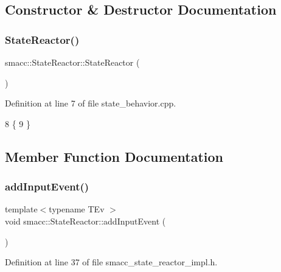 \subsection{Constructor \& Destructor Documentation}
\mbox{\label{classsmacc_1_1StateReactor_ae319e9f7b0a2a80b4c5ace6ec8c99fb2}} 
\subsubsection{\texorpdfstring{State\+Reactor()}{StateReactor()}}
{\footnotesize\ttfamily smacc\+::\+State\+Reactor\+::\+State\+Reactor (\begin{DoxyParamCaption}{ }\end{DoxyParamCaption})}



Definition at line 7 of file state\+\_\+behavior.\+cpp.


\begin{DoxyCode}
8 \{
9 \}
\end{DoxyCode}


\subsection{Member Function Documentation}
\mbox{\label{classsmacc_1_1StateReactor_acd4b35b4c82241fc27bb858761f6e4de}} 
\subsubsection{\texorpdfstring{add\+Input\+Event()}{addInputEvent()}}
{\footnotesize\ttfamily template$<$typename T\+Ev $>$ \\
void smacc\+::\+State\+Reactor\+::add\+Input\+Event (\begin{DoxyParamCaption}{ }\end{DoxyParamCaption})}



Definition at line 37 of file smacc\+\_\+state\+\_\+reactor\+\_\+impl.\+h.



